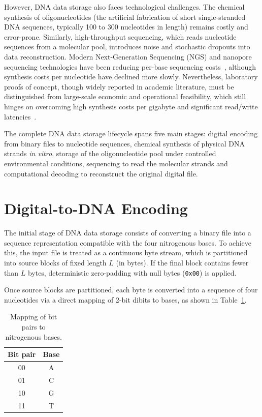 However, DNA data storage also faces technological challenges. The chemical synthesis of oligonucleotides (the artificial fabrication of short single-stranded DNA sequences, typically 100 to 300 nucleotides in length) remains costly and error-prone. Similarly, high-throughput sequencing, which reads nucleotide sequences from a molecular pool, introduces noise and stochastic dropouts into data reconstruction. Modern Next-Generation Sequencing (NGS) and nanopore sequencing technologies have been reducing per-base sequencing costs~\cite{ceze2019}, although synthesis costs per nucleotide have declined more slowly. Nevertheless, laboratory proofs of concept, though widely reported in academic literature, must be distinguished from large-scale economic and operational feasibility, which still hinges on overcoming high synthesis costs per gigabyte and significant read/write latencies~\cite{ceze2019}.

The complete DNA data storage lifecycle spans five main stages: digital encoding from binary files to nucleotide sequences, chemical synthesis of physical DNA strands \emph{in vitro}, storage of the oligonucleotide pool under controlled environmental conditions, sequencing to read the molecular strands and computational decoding to reconstruct the original digital file.

\section{Digital-to-DNA Encoding}
\label{sec:digital_to_dna_encoding}

The initial stage of DNA data storage consists of converting a binary file into a sequence representation compatible with the four nitrogenous bases. To achieve this, the input file is treated as a continuous byte stream, which is partitioned into source blocks of fixed length $L$ (in bytes). If the final block contains fewer than $L$ bytes, deterministic zero-padding with null bytes (\texttt{0x00}) is applied.

Once source blocks are partitioned, each byte is converted into a sequence of four nucleotides via a direct mapping of 2-bit dibits to bases, as shown in Table~\ref{tab:mapeamento_bits_dna}.

\begin{table}[htbp]
    \centering
    \caption{Mapping of bit pairs to nitrogenous bases.}
    \label{tab:mapeamento_bits_dna}
    \begin{tabular}{cc}
        \hline
        \textbf{Bit pair} & \textbf{Base} \\
        \hline
        00 & A \\
        01 & C \\
        10 & G \\
        11 & T \\
        \hline
    \end{tabular}
\end{table}

